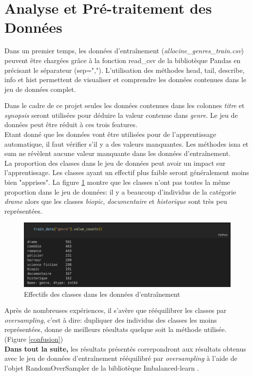 \section{Analyse et Pré-traitement des Données}
Dans un premier temps, les données d'entraînement (\textit{allocine\_genres\_train.csv}) peuvent être chargées grâce à la fonction \textsf{read\_csv} de la bibliotèque Pandas \cite{pandas} en précisant le séparateur (\textsf{sep=","}). L'utilisation des méthodes \textsf{head}, \textsf{tail}, \textsf{describe}, \textsf{info} et \textsf{hist} permettent de visualiser et comprendre les données contenues dans le jeu de données complet.

Dans le cadre de ce projet seules les données contenues dans les colonnes \textit{titre} et \textit{synopsis} seront utilisées pour déduire la valeur contenue dans \textit{genre}. Le jeu de données peut être réduit à ces trois features.\\
Etant donné que les données vont être utilisées pour de l'apprentissage automatique, il faut vérifier s'il y a des valeurs manquantes. Les méthodes \textsf{isna} et \textsf{sum} ne révèlent aucune valeur manquante dans les données d'entraînement.\\
La proportion des classes dans le jeu de données peut avoir un impact sur l'apprentissage. Les classes ayant un effectif plus faible seront généralement moins bien "apprises". La figure \ref{value_counts} montre que les classes n'ont pas toutes la même proportion dans le jeu de données: il y a beaucoup d'individus de la catégorie \textit{drame} alors que les classes \textit{biopic}, \textit{documentaire} et \textit{historique} sont très peu représentées.

\begin{figure}
    \center
    \includegraphics[scale=.3]{img/value_counts.png}
    \caption{Effectifs des classes dans les données d'entraînement}
    \label{value_counts}
\end{figure}

Après de nombreuses expériences, il s'avère que rééquilibrer les classes par \textit{oversampling}, c'est à dire: dupliquer des individus des classes les moins représentées, donne de meilleurs résultats quelque soit la méthode utilisée. (Figure \ref{confusion})\\
\textbf{Dans tout la suite,} les résultats présentés correpondront aux résultats obtenus avec le jeu de données d'entraînement rééquilibré par \textit{oversampling} à l'aide de l'objet \textsf{RandomOverSampler} de la bibliotèque Imbalanced-learn \cite{imbalanced_learn}.

